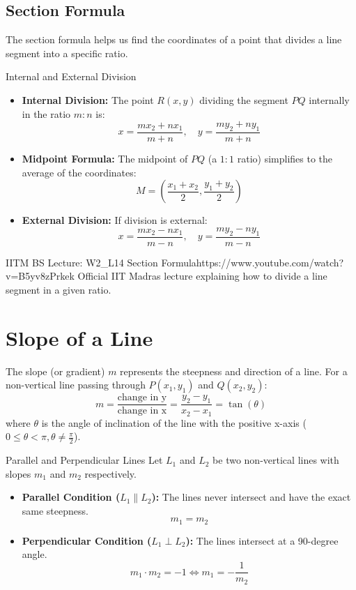 \subsection{Section Formula}
The section formula helps us find the coordinates of a point that divides a line segment into a specific ratio.
\begin{formulabox}{Internal and External Division}
\begin{itemize}
    \item \textbf{Internal Division:} The point $R(x, y)$ dividing the segment $PQ$ internally in the ratio $m : n$ is:
    $$x = \frac{m x_2 + n x_1}{m + n}, \quad y = \frac{m y_2 + n y_1}{m + n}$$
    \item \textbf{Midpoint Formula:} The midpoint of $PQ$ (a $1:1$ ratio) simplifies to the average of the coordinates:
    $$M = \left( \frac{x_1 + x_2}{2}, \frac{y_1 + y_2}{2} \right)$$
    \item \textbf{External Division:} If division is external:
    $$x = \frac{m x_2 - n x_1}{m - n}, \quad y = \frac{m y_2 - n y_1}{m - n}$$
\end{itemize}
\end{formulabox}

\begin{videocard}{IITM BS Lecture: W2\_L14 Section Formula}{https://www.youtube.com/watch?v=B5yv8zPrkek}
Official IIT Madras lecture explaining how to divide a line segment in a given ratio.
\end{videocard}

\section{Slope of a Line}

The slope (or gradient) $m$ represents the steepness and direction of a line. For a non-vertical line passing through $P(x_1, y_1)$ and $Q(x_2, y_2)$:
$$m = \frac{\text{change in y}}{\text{change in x}} = \frac{y_2 - y_1}{x_2 - x_1} = \tan(\theta)$$
where $\theta$ is the angle of inclination of the line with the positive x-axis ($0 \le \theta < \pi, \theta \neq \frac{\pi}{2}$).

\begin{theorembox}{Parallel and Perpendicular Lines}
Let $L_1$ and $L_2$ be two non-vertical lines with slopes $m_1$ and $m_2$ respectively.
\begin{itemize}
    \item \textbf{Parallel Condition ($L_1 \parallel L_2$):} The lines never intersect and have the exact same steepness.
    $$m_1 = m_2$$
    \item \textbf{Perpendicular Condition ($L_1 \perp L_2$):} The lines intersect at a 90-degree angle.
    $$m_1 \cdot m_2 = -1 \iff m_1 = -\frac{1}{m_2}$$
\end{itemize}
\end{theorembox}

